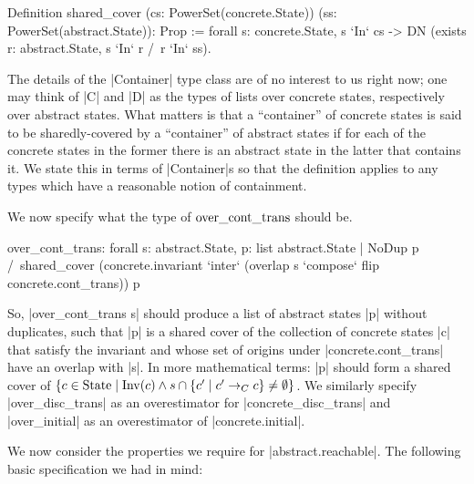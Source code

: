 \documentclass[runningheads]{llncs}
\newcommand{\State}{{\rm State}}
\newcommand{\Inv}{{\rm Inv}}
\newcommand{\contrans}{\rightarrow_C}
\newcommand{\overcontrans}{{\rm over\_cont\_trans}}
\begin{document}
\begin{code}
  Definition shared_cover
    (cs: PowerSet(concrete.State)) (ss: PowerSet(abstract.State)): Prop :=
        forall s: concrete.State, s `In` cs -> DN (exists r: abstract.State, s `In` r /\ r `In` ss).
\end{code}

The details of the |Container| type class are of no interest to us
right now; one may think of |C| and |D| as the types of lists over
concrete states, respectively over abstract states.  What matters is
that a ``container'' of concrete states is said to be sharedly-covered
by a ``container'' of abstract states if for each of the concrete
states in the former there is an abstract state in the latter that
contains it.
We state this in
terms of |Container|s so that the definition applies to any types
which have a reasonable notion of containment.

We now specify what the type of $\overcontrans$ should be.
\begin{code}
over_cont_trans: forall s: abstract.State,
  { p: list abstract.State | NoDup p /\ shared_cover
    (concrete.invariant `inter` (overlap s `compose` flip concrete.cont_trans)) p }
\end{code}
So, |over_cont_trans s| should produce a list of abstract states |p|
without duplicates,
such that |p| is a shared cover of the collection
of concrete states |c| that satisfy the invariant and whose set of
origins under |concrete.cont_trans| have an overlap with |s|. In more
mathematical terms: |p| should form a shared cover of $\{ c \in \State
\mid \Inv(c) \wedge s\cap \{c' \mid c' \contrans c\} \neq \emptyset\}$.
We similarly specify |over_disc_trans| as an overestimator for
|concrete_disc_trans| and |over_initial| as an overestimator of
|concrete.initial|. 

We now consider the properties we require for |abstract.reachable|. The following basic specification we had in mind:
\end{document}
